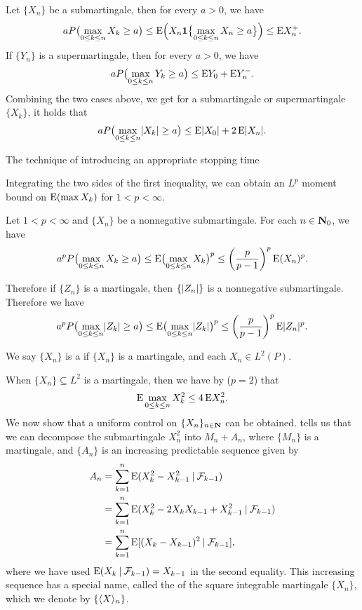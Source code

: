 \begin{namedthm}
    Let $\{X_n\}$ be a submartingale, then for every $a > 0$, we have \[
        a P\bigl(\max_{0\leq k \leq n} X_k \geq a\bigr) \leq \mathop{}\!\mathrm{E}\Bigl(X_n \mathbf{1}\bigl\{\max_{0\leq k \leq n}X_n \geq a\bigr\}\Bigr) \leq \mathop{}\!\mathrm{E} X_n^+.
    \]
    If $\{Y_n\}$ is a supermartingale, then  for every $a > 0$, we have \[
        a P\bigl(\max_{0\leq k \leq n} Y_k \geq a\bigr) \leq \mathop{}\!\mathrm{E} Y_0 + \mathop{}\!\mathrm{E} Y_n^-.
    \]
    Combining the two cases above, we get for a submartingale or supermartingale $\{X_k\}$, it holds that \[
        a P\bigl(\max_{0\leq k \leq n} \lvert X_k \rvert \geq a\bigr) \leq \mathop{}\!\mathrm{E} \lvert X_0 \rvert + 2 \mathop{}\!\mathrm{E} \lvert X_n \rvert.
    \]
\end{namedthm}

The technique of introducing an appropriate stopping time

Integrating the two sides of the first inequality, we can obtain an $L^p$ moment bound on $\mathop{}\!\mathrm{E}(\max X_k)$ for $1 < p < \infty$.

\begin{namedthm} \label{thm:Doob-Lp-discrete}
    Let $1 < p < \infty$ and $\{X_n\}$ be a nonnegative submartingale. For each $n\in \mathbf{N}_0$, we have \[
        a^p P\bigl(\max_{0\leq k \leq n} X_k \geq a\bigr) \leq \mathop{}\!\mathrm{E} \bigl(\max_{0\leq k \leq n} X_k\bigr)^p \leq \biggl(\frac{p}{p-1}\biggr)^p \mathop{}\!\mathrm{E}(X_n)^p.
    \]

    Therefore if $\{Z_n\}$ is a martingale, then $\{\lvert Z_n \rvert\}$ is a nonnegative submartingale. Therefore we have \[
        a^p P\bigl(\max_{0\leq k \leq n} \lvert Z_k \rvert \geq a\bigr) \leq \mathop{}\!\mathrm{E} \bigl(\max_{0\leq k \leq n} \lvert Z_k \rvert\bigr)^p \leq \biggl(\frac{p}{p-1}\biggr)^p \mathop{}\!\mathrm{E}\lvert Z_n \rvert^p.
    \]
\end{namedthm}


We say $\{X_n\}$ is a  if $\{X_n\}$ is a martingale, and each $X_n \in L^2(P)$.

When $\{X_n\} \subseteq L^2$ is a martingale, then we have by  ($p=2$) that \begin{equation}
    \E \max_{0\leq k \leq n} X_k^2  \leq 4 \E X_n^2. \label{eq:apply-L2-maximal}
\end{equation}
We now show that a uniform control on $\{X_n\}_{n\in \mathbf{N}}$ can be obtained.
 tells us that we can decompose the submartingale $X_n^2$ into $M_n + A_n$, where $\{M_n\}$ is a martingale, and $\{A_n\}$ is an increasing predictable sequence given by \begin{align*}
    A_n & = \sum_{k=1}^n \mathop{}\!\mathrm{E}(X_k^2 - X_{k-1}^2 \mathbin{|} \mathcal{F}_{k-1}) \\
    & = \sum_{k=1}^n \mathop{}\!\mathrm{E}(X_k^2 - 2 X_k X_{k-1} + X_{k-1}^2 \mathbin{|} \mathcal{F}_{k-1})\\
    & = \sum_{k=1}^n \mathop{}\!\mathrm{E}[(X_k- X_{k-1})^2 \mathbin{|} \mathcal{F}_{k-1}],
\end{align*}
where we have used $\mathop{}\!\mathrm{E}(X_k \mathbin{|} \mathcal{F}_{k-1}) = X_{k-1}$ in the second equality. This increasing sequence has a special name, called the  of the square integrable martingale $\{X_n\}$, which we denote by $\{\langle X \rangle_n\}$.

